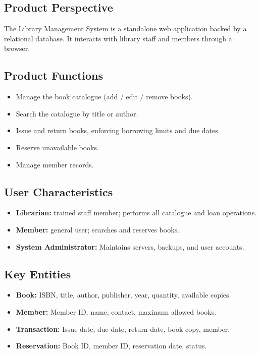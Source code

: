 \documentclass[11pt,a4paper]{article}
\newcommand{\projecttitle}{Library Management System}   %
\begin{document}
\subsection{Product Perspective}
The \projecttitle{} is a standalone web application backed by a relational
database. It interacts with library staff and members through a browser.

\subsection{Product Functions}
\begin{itemize}[leftmargin=*]
  \item Manage the book catalogue (add / edit / remove books).
  \item Search the catalogue by title or author.
  \item Issue and return books, enforcing borrowing limits and due dates.
  \item Reserve unavailable books.
  \item Manage member records.
\end{itemize}

\subsection{User Characteristics}
\begin{itemize}[leftmargin=*]
  \item \textbf{Librarian:} trained staff member; performs all catalogue and loan operations.
  \item \textbf{Member:} general user; searches and reserves books.
  \item \textbf{System Administrator:} Maintains servers, backups, and user accounts.
\end{itemize}

\subsection{Key Entities}
\begin{itemize}[leftmargin=*]
  \item \textbf{Book:} ISBN, title, author, publisher, year, quantity, available copies.
  \item \textbf{Member:} Member ID, name, contact, maximum allowed books.
  \item \textbf{Transaction:} Issue date, due date, return date, book copy, member.
  \item \textbf{Reservation:} Book ID, member ID, reservation date, status.
\end{itemize}
\end{document}
